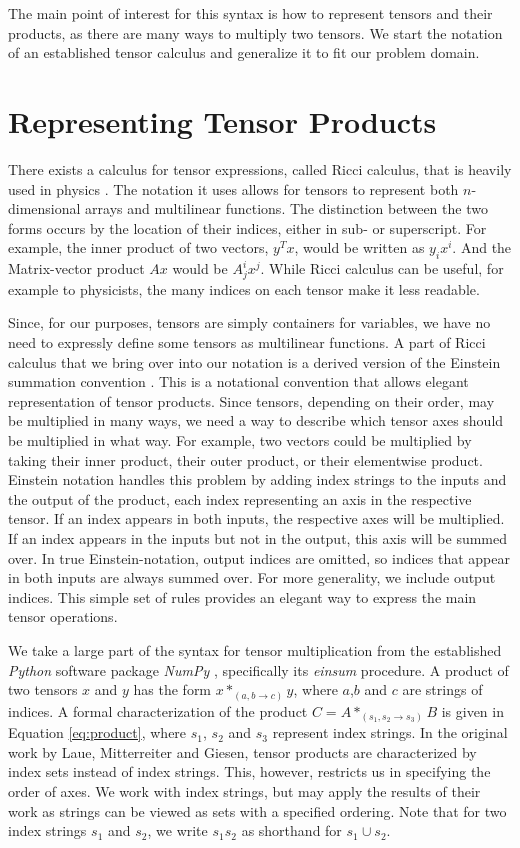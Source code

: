 \documentclass[12pt, a4paper]{report} %
\begin{document}
The main point of interest for this syntax is how to represent tensors and their products, as there are many ways to multiply two tensors.
We start the notation of an established tensor calculus and generalize it to fit our problem domain.

\section{Representing Tensor Products}
There exists a calculus for tensor expressions, called Ricci calculus, that is heavily used in physics \cite{ricci}. 
The notation it uses allows for tensors to represent both $n$-dimensional arrays and multilinear functions.
The distinction between the two forms occurs by the location of their indices, either in sub- or superscript.
For example, the inner product of two vectors, $y^Tx$, would be written as $y_ix^i$. And the Matrix-vector product $Ax$ would be $A^i_jx^j$.
While Ricci calculus can be useful, for example to physicists, the many indices on each tensor make it less readable.

Since, for our purposes, tensors are simply containers for variables, we have no need to expressly define some tensors as multilinear functions.
A part of Ricci calculus that we bring over into our notation is a derived version of the Einstein summation convention \cite{einstein}.
This is a notational convention that allows elegant representation of tensor products.
Since tensors, depending on their order, may be multiplied in many ways, we need a way to describe which tensor axes should be multiplied in what way.
For example, two vectors could be multiplied by taking their inner product, their outer product, or their elementwise product.
Einstein notation handles this problem by adding index strings to the inputs and the output of the product, each index representing an axis in the respective tensor.
If an index appears in both inputs, the respective axes will be multiplied.
If an index appears in the inputs but not in the output, this axis will be summed over.
In true Einstein-notation, output indices are omitted, so indices that appear in both inputs are always summed over. 
For more generality, we include output indices.
This simple set of rules provides an elegant way to express the main tensor operations.

We take a large part of the syntax for tensor multiplication from the established \textit{Python} software package \textit{NumPy} \cite{numpy}, specifically its \textit{einsum} procedure.
A product of two tensors $x$ and $y$ has the form $x*_{(a,b \rightarrow c)}y$, where $a$,$b$ and $c$ are strings of indices.
A formal characterization of the product $C = A *_{(s_1,s_2 \rightarrow s_3)} B$ is given in Equation \ref{eq:product}, where $s_1$, $s_2$ and $s_3$ represent index strings.
In the original work \cite{tensorpaper} by Laue, Mitterreiter and Giesen, tensor products are characterized by index sets instead of index strings.
This, however, restricts us in specifying the order of axes.
We work with index strings, but may apply the results of their work as strings can be viewed as sets with a specified ordering.
Note that for two index strings $s_1$ and $s_2$, we write $s_1 s_2$ as shorthand for $s_1 \cup s_2$.
\end{document}
